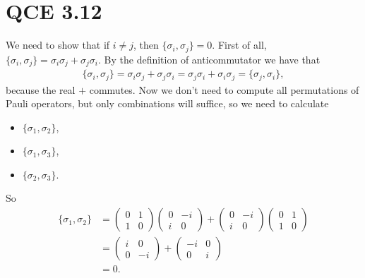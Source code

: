 \documentclass[10pt]{article}
\begin{document}
\section*{QCE 3.12}
We need to show that if $i \neq j$, then $\{ \sigma_i, \sigma_j \} = 0$. First of all, $\{ \sigma_i, \sigma_j \} = \sigma_i \sigma_j + \sigma_j \sigma_i$. By the definition of anticommutator we have that
\begin{align*}
\{ \sigma_i, \sigma_j \} = \sigma_i \sigma_j + \sigma_j \sigma_i = \sigma_j \sigma_i + \sigma_i \sigma_j = \{ \sigma_j , \sigma_i \},
\end{align*} 
because the real $+$ commutes. Now we don't need to compute all permutations of Pauli operators, but only combinations will suffice, so we need to calculate
\begin{itemize}
\item $\{ \sigma_1, \sigma_2 \}$,
\item $\{ \sigma_1, \sigma_3 \}$,
\item $\{ \sigma_2, \sigma_3 \}$.
\end{itemize}
So
\begin{align*}
\{ \sigma_1, \sigma_2 \} &= 
\begin{pmatrix}
0 & 1 \\
1 & 0
\end{pmatrix}
\begin{pmatrix}
0 & -i \\
i & 0
\end{pmatrix} + \begin{pmatrix}
0 & -i \\
i & 0
\end{pmatrix}
\begin{pmatrix}
0 & 1 \\
1 & 0
\end{pmatrix} \\
   &= 
   \begin{pmatrix}
   i & 0 \\
   0 & -i
   \end{pmatrix} +
   \begin{pmatrix}
   -i & 0 \\
   0 & i
   \end{pmatrix} \\
   &= 0.
\end{align*}
\end{document}
